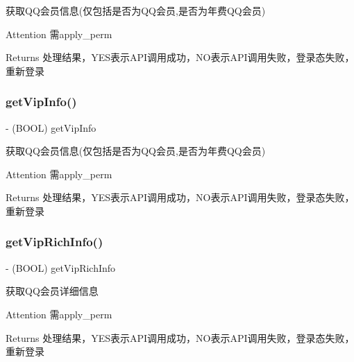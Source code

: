 获取\+Q\+Q会员信息(仅包括是否为\+Q\+Q会员,是否为年费\+Q\+Q会员) \begin{DoxyAttention}{Attention}
需apply\+\_\+perm 
\end{DoxyAttention}
\begin{DoxyReturn}{Returns}
处理结果，\+Y\+E\+S表示\+A\+P\+I调用成功，\+N\+O表示\+A\+P\+I调用失败，登录态失败，重新登录 
\end{DoxyReturn}
\mbox{\label{interface_tencent_o_auth_a0dca2b46ec141f5718f2fc8cecab251a}} 
\subsubsection{\texorpdfstring{get\+Vip\+Info()}{getVipInfo()}\hspace{0.1cm}{\footnotesize\ttfamily [2/2]}}
{\footnotesize\ttfamily -\/ (B\+O\+OL) get\+Vip\+Info \begin{DoxyParamCaption}{ }\end{DoxyParamCaption}}

获取\+Q\+Q会员信息(仅包括是否为\+Q\+Q会员,是否为年费\+Q\+Q会员) \begin{DoxyAttention}{Attention}
需apply\+\_\+perm 
\end{DoxyAttention}
\begin{DoxyReturn}{Returns}
处理结果，\+Y\+E\+S表示\+A\+P\+I调用成功，\+N\+O表示\+A\+P\+I调用失败，登录态失败，重新登录 
\end{DoxyReturn}
\mbox{\label{interface_tencent_o_auth_a6adee28cfff5d7f7cca6a648e1f2f638}} 
\subsubsection{\texorpdfstring{get\+Vip\+Rich\+Info()}{getVipRichInfo()}\hspace{0.1cm}{\footnotesize\ttfamily [1/2]}}
{\footnotesize\ttfamily -\/ (B\+O\+OL) get\+Vip\+Rich\+Info \begin{DoxyParamCaption}{ }\end{DoxyParamCaption}}

获取\+Q\+Q会员详细信息 \begin{DoxyAttention}{Attention}
需apply\+\_\+perm 
\end{DoxyAttention}
\begin{DoxyReturn}{Returns}
处理结果，\+Y\+E\+S表示\+A\+P\+I调用成功，\+N\+O表示\+A\+P\+I调用失败，登录态失败，重新登录 
\end{DoxyReturn}
\mbox{\label{interface_tencent_o_auth_a6adee28cfff5d7f7cca6a648e1f2f638}} 
